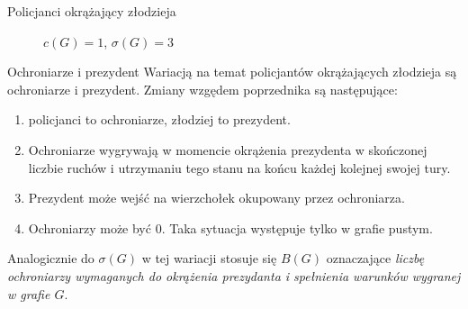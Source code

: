 \documentclass[polish]{beamer}
\begin{document}
\begin{frame}{Policjanci okrążający złodzieja}
\begin{examples}
\begin{figure}
\begin{columns}[t]
{
                        \caption{$c\left(G\right) = 1$, $\sigma\left(G\right) = 3$}
                    }
            \end{columns}
        \end{figure}   
    \end{examples}
\end{frame}

\begin{frame}{Ochroniarze i prezydent}
    Wariacją na temat policjantów okrążających złodzieja są ochroniarze i prezydent.\cite{b_s_p}
    Zmiany wzgędem poprzednika są następujące:
    \pause
    \begin{enumerate}[<+->]
        \item policjanci to ochroniarze, złodziej to prezydent.
        \item Ochroniarze wygrywają w momencie okrążenia prezydenta w skończonej liczbie ruchów i
         utrzymaniu tego stanu na końcu każdej kolejnej swojej tury. 
        \item Prezydent może wejść na wierzchołek okupowany przez ochroniarza.
        \item Ochroniarzy może być $0$. Taka sytuacja występuje tylko w grafie pustym.
    \end{enumerate}

    \pause
    Analogicznie do $\sigma\left(G\right)$ w tej wariacji stosuje się $B\left(G\right)$ oznaczające 
    \textit{liczbę ochroniarzy wymaganych do okrążenia prezydanta i spełnienia warunków wygranej w grafie $G$}.
 \end{frame}
\end{document}

